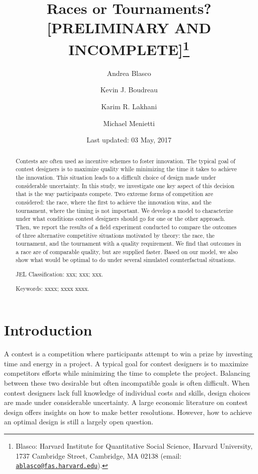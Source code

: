 \documentclass[12pt,]{article}
\title{Races or Tournaments? {[}PRELIMINARY AND INCOMPLETE{]}\thanks{Blasco: Harvard Institute for Quantitative Social Science, Harvard
University, 1737 Cambridge Street, Cambridge, MA 02138 (email:
\href{mailto:ablasco@fas.harvard.edu}{\nolinkurl{ablasco@fas.harvard.edu}}).}}
\author{Andrea Blasco \and Kevin J. Boudreau \and Karim R. Lakhani \and Michael Menietti}
\date{Last updated: 03 May, 2017}
\theoremstyle{plain} %
\begin{document}
\maketitle
\begin{abstract}
Contests are often used as incentive schemes to foster innovation. The
typical goal of contest designers is to maximize quality while
minimizing the time it takes to achieve the innovation. This situation
leads to a difficult choice of design made under considerable
uncertainty. In this study, we investigate one key aspect of this
decision that is the way participants compete. Two extreme forms of
competition are considered: the race, where the first to achieve the
innovation wins, and the tournament, where the timing is not important.
We develop a model to characterize under what conditions contest
designers should go for one or the other approach. Then, we report the
results of a field experiment conducted to compare the outcomes of three
alternative competitive situations motivated by theory: the race, the
tournament, and the tournament with a quality requirement. We find that
outcomes in a race are of comparable quality, but are supplied faster.
Based on our model, we also show what would be optimal to do under
several simulated counterfactual situations.

\smallskip\noindent 
JEL Classification: xxx; xxx; xxx.

\smallskip\noindent 
Keywords: xxxx; xxxx xxxx.
\end{abstract}


\clearpage
\tableofcontents
\setcounter{tocdepth}{2}
\clearpage

\section{Introduction}\label{introduction}

A contest is a competition where participants attempt to win a prize by
investing time and energy in a project. A typical goal for contest
designers is to maximize competitors efforts while minimizing the time
to complete the project. Balancing between these two desirable but often
incompatible goals is often difficult. When contest designers lack full
knowledge of individual costs and skills, design choices are made under
considerable uncertainty. A large economic literature on contest design
offers insights on how to make better resolutions. However, how to
achieve an optimal design is still a largely open question.
\end{document}
